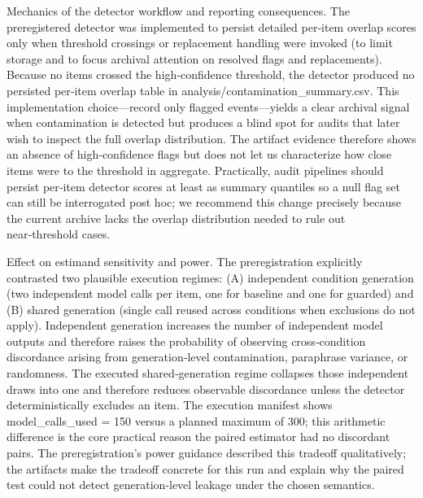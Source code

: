 \documentclass[conference]{IEEEtran}
\begin{document}
Mechanics of the detector workflow and reporting consequences. The preregistered detector was implemented to persist detailed per‑item overlap scores only when threshold crossings or replacement handling were invoked (to limit storage and to focus archival attention on resolved flags and replacements). Because no items crossed the high‑confidence threshold, the detector produced no persisted per‑item overlap table in analysis/contamination\_summary.csv. This implementation choice---record only flagged events---yields a clear archival signal when contamination is detected but produces a blind spot for audits that later wish to inspect the full overlap distribution. The artifact evidence therefore shows an absence of high‑confidence flags but does not let us characterize how close items were to the threshold in aggregate. Practically, audit pipelines should persist per‑item detector scores at least as summary quantiles so a null flag set can still be interrogated post hoc; we recommend this change precisely because the current archive lacks the overlap distribution needed to rule out near‑threshold cases.

Effect on estimand sensitivity and power. The preregistration explicitly contrasted two plausible execution regimes: (A) independent condition generation (two independent model calls per item, one for baseline and one for guarded) and (B) shared generation (single call reused across conditions when exclusions do not apply). Independent generation increases the number of independent model outputs and therefore raises the probability of observing cross‑condition discordance arising from generation‑level contamination, paraphrase variance, or randomness. The executed shared‑generation regime collapses those independent draws into one and therefore reduces observable discordance unless the detector deterministically excludes an item. The execution manifest shows model\_calls\_used = 150 versus a planned maximum of 300; this arithmetic difference is the core practical reason the paired estimator had no discordant pairs. The preregistration's power guidance described this tradeoff qualitatively; the artifacts make the tradeoff concrete for this run and explain why the paired test could not detect generation‑level leakage under the chosen semantics.
\end{document}
